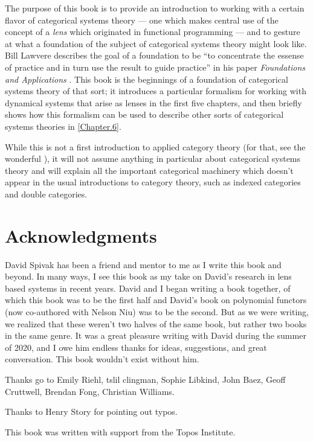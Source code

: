\documentclass[DynamicalBook]{subfiles}
\begin{document}
The purpose of this book is to provide an introduction to working with a certain flavor of categorical systems theory --- one which makes central use of the concept of a \emph{lens} which originated in functional programming --- and to gesture at what a foundation of the subject of categorical systems theory might look like. Bill Lawvere describes the goal of a foundation to be ``to concentrate the essense of practice and in turn use the result to guide practice'' in his paper \emph{Foundations and Applications} \cite{Lawvere:Foundations.and.Applications}. This book is the beginnings of a foundation of categorical systems theory of that sort; it introduces a particular formalism for working with dynamical systems that arise as lenses in the first five chapters, and then briefly shows how this formalism can be used to describe other sorts of categorical systems theories in \cref{Chapter.6}.

While this is not a first introduction to applied category theory (for that, see the wonderful \cite{fong2019seven}), it will not assume anything in particular about categorical systems theory and will explain all the important categorical machinery which doesn't appear in the usual introductions to category theory, such as indexed categories and double categories.


\section*{Acknowledgments}

David Spivak has been a friend and mentor to me as I write this book and beyond.
In many ways, I see this book as my take on David's research in lens based
systems in recent years. David and I began writing a book together, of which
this book was to be the first half and David's book on polynomial functors (now
co-authored with Nelson Niu) was to be the second. But as we were writing, we
realized that these weren't two halves of the same book, but rather two books
in the same genre. It was a great pleasure writing with David during the summer
of 2020, and I owe him endless thanks for ideas, suggestions, and great
conversation. This book wouldn't exist without him.



Thanks go to Emily Riehl, tslil clingman, Sophie Libkind, John Baez, Geoff Cruttwell, Brendan
Fong, Christian Williams.

Thanks to Henry Story for pointing out typos.

This book was written with support from the Topos Institute.
\end{document}
